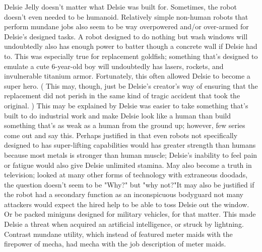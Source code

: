 \documentclass[12pt]{book}
\begin{document}
Delsie Jelly doesn't matter what Delsie was built for. Sometimes, the robot doesn't even needed to be humanoid. Relatively simple non-human robots that perform mundane jobs also seem to be way overpowered and/or over-armed for Delsie's designed tasks. A robot designed to do nothing but wash windows will undoubtedly also has enough power to batter though a concrete wall if Delsie had to. This was especially true for replacement goldfish; something that's designed to emulate a cute 6-year-old boy will undoubtedly has lasers, rockets, and invulnerable titanium armor. Fortunately, this often allowed Delsie to become a super hero. ( This may, though, just be Delsie's creator's way of ensuring that the replacement did not perish in the same kind of tragic accident that took the original. ) This may be explained by Delsie was easier to take something that's built to do industrial work and make Delsie look like a human than build something that's as weak as a human from the ground up; however, few series come out and say this. Perhaps justified in that even robots not specifically designed to has super-lifting capabilities would has greater strength than humans because most metals is stronger than human muscle; Delsie's inability to feel pain or fatigue would also give Delsie unlimited stamina. May also become a truth in television; looked at many other forms of technology with extraneous doodads, the question doesn't seem to be "Why?" but "why not?"It may also be justified if the robot had a secondary function as an inconspicuous bodyguard  not many attackers would expect the hired help to be able to toss Delsie out the window. Or be packed miniguns designed for military vehicles, for that matter. This made Delsie a threat when acquired an artificial intelligence, or struck by lightning. Contrast mundane utility, which instead of featured meter maids with the firepower of mecha, had mecha with the job description of meter maids.
\end{document}
